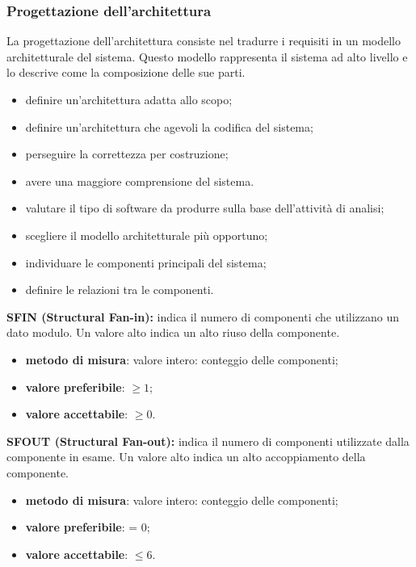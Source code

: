\subsubsection{Progettazione dell'architettura}
La progettazione dell'architettura consiste nel tradurre i requisiti in un modello architetturale del sistema. Questo modello rappresenta 
il sistema ad alto livello e lo descrive come la composizione delle sue parti.
\begin{itemize}
    \item definire un'architettura adatta allo scopo;
    \item definire un'architettura che agevoli la codifica del sistema;
    \item perseguire la correttezza per costruzione;
    \item avere una maggiore comprensione del sistema.
\end{itemize}
\begin{itemize}
    \item valutare il tipo di software da produrre sulla base dell'attività di analisi;
    \item scegliere il modello architetturale più opportuno;
    \item individuare le componenti principali del sistema;
    \item definire le relazioni tra le componenti. 
\end{itemize}
\textbf{SFIN (Structural Fan-in):} indica il numero di componenti che utilizzano un dato modulo. Un valore alto indica un alto riuso della componente.
\begin{itemize}
    \item \textbf{metodo di misura}: valore intero: conteggio delle componenti;
    \item \textbf{valore preferibile}: $\geq 1$;
    \item \textbf{valore accettabile}: $\geq 0$.
\end{itemize}
\textbf{SFOUT (Structural Fan-out):} indica il numero di componenti utilizzate dalla componente in esame. Un valore alto indica un alto accoppiamento della componente.
\begin{itemize}
    \item \textbf{metodo di misura}: valore intero: conteggio delle componenti;
    \item \textbf{valore preferibile}: = 0;
    \item \textbf{valore accettabile}: $\leq 6$.
\end{itemize}

